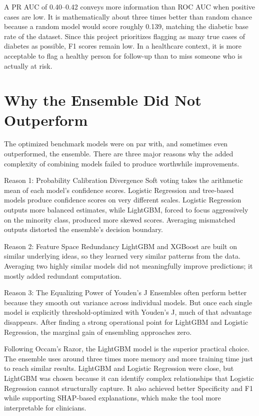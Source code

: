 \documentclass[11pt,letterpaper]{article}
\begin{document}
A PR AUC of 0.40--0.42 conveys more information than ROC AUC when positive cases are low. It is mathematically about three times better than random chance because a random model would score roughly 0.139, matching the diabetic base rate of the dataset. Since this project prioritizes flagging as many true cases of diabetes as possible, F1 scores remain low. In a healthcare context, it is more acceptable to flag a healthy person for follow-up than to miss someone who is actually at risk.

\section{Why the Ensemble Did Not Outperform}
The optimized benchmark models were on par with, and sometimes even outperformed, the ensemble. There are three major reasons why the added complexity of combining models failed to produce worthwhile improvements.

\begin{methodbox}{Reason 1: Probability Calibration Divergence}
Soft voting takes the arithmetic mean of each model's confidence scores. Logistic Regression and tree-based models produce confidence scores on very different scales. Logistic Regression outputs more balanced estimates, while LightGBM, forced to focus aggressively on the minority class, produced more skewed scores. Averaging mismatched outputs distorted the ensemble's decision boundary.
\end{methodbox}

\begin{methodbox}{Reason 2: Feature Space Redundancy}
LightGBM and XGBoost are built on similar underlying ideas, so they learned very similar patterns from the data. Averaging two highly similar models did not meaningfully improve predictions; it mostly added redundant computation.
\end{methodbox}

\begin{methodbox}{Reason 3: The Equalizing Power of Youden's J}
Ensembles often perform better because they smooth out variance across individual models. But once each single model is explicitly threshold-optimized with Youden's J, much of that advantage disappears. After finding a strong operational point for LightGBM and Logistic Regression, the marginal gain of ensembling approaches zero.
\end{methodbox}

Following Occam's Razor, the LightGBM model is the superior practical choice. The ensemble uses around three times more memory and more training time just to reach similar results. LightGBM and Logistic Regression were close, but LightGBM was chosen because it can identify complex relationships that Logistic Regression cannot structurally capture. It also achieved better Specificity and F1 while supporting SHAP-based explanations, which make the tool more interpretable for clinicians.
\end{document}
